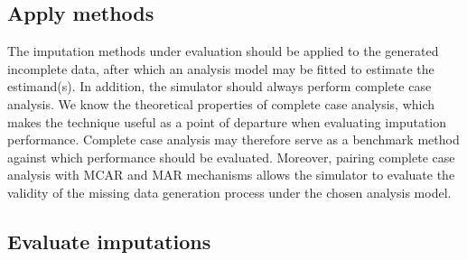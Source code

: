 \documentclass[bimj,fleqn]{w-art}
\begin{document}

\subsection{Apply methods}


The imputation methods under evaluation should be applied to the generated incomplete data, after which an analysis model may be fitted to estimate the estimand(s). %
In addition, the simulator should always perform complete case analysis. We know the theoretical properties of complete case analysis, which makes the technique useful as a point of departure when evaluating imputation performance. Complete case analysis may therefore serve as a benchmark method against which performance should be evaluated. Moreover, pairing complete case analysis with MCAR and MAR mechanisms allows the simulator to evaluate the validity of the missing data generation process under the chosen analysis model.%


\subsection{Evaluate imputations}

\end{document}
